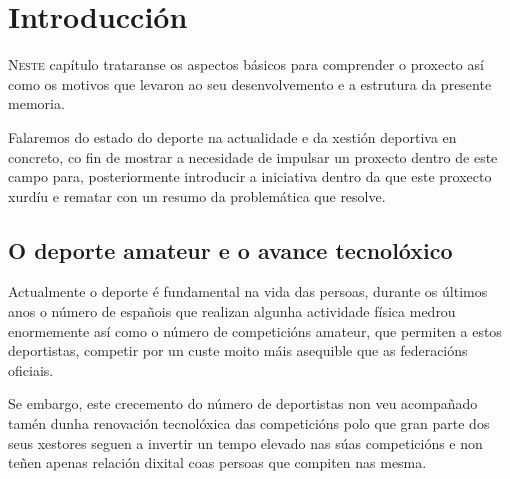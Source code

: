 \chapter{Introducción}
\minitoc


 \lettrine{N}{este} capítulo trataranse os aspectos básicos para comprender o proxecto 
así como os motivos que levaron ao seu desenvolvemento e a estrutura da presente 
memoria.

  Falaremos do estado do deporte na actualidade e da xestión deportiva en 
concreto, co fin de mostrar a necesidade de impulsar un proxecto dentro de este 
campo para, posteriormente introducir a iniciativa dentro da que este
proxecto xurdíu e rematar con un resumo da problemática que resolve.

 
  \section{O deporte amateur e o avance tecnolóxico}

    Actualmente o deporte é fundamental na vida das persoas, durante os últimos anos o 
número de españois que realizan algunha actividade física medrou enormemente así como o 
número de competicións amateur, que permiten a estos deportistas, competir por un custe 
moito máis asequible que as federacións oficiais.

    Se embargo, este crecemento do número de deportistas non veu acompañado tamén dunha 
renovación tecnolóxica das competicións polo que gran parte dos seus xestores seguen
a invertir un tempo elevado nas súas competicións e non teñen apenas 
relación dixital coas persoas que compiten nas mesma.

